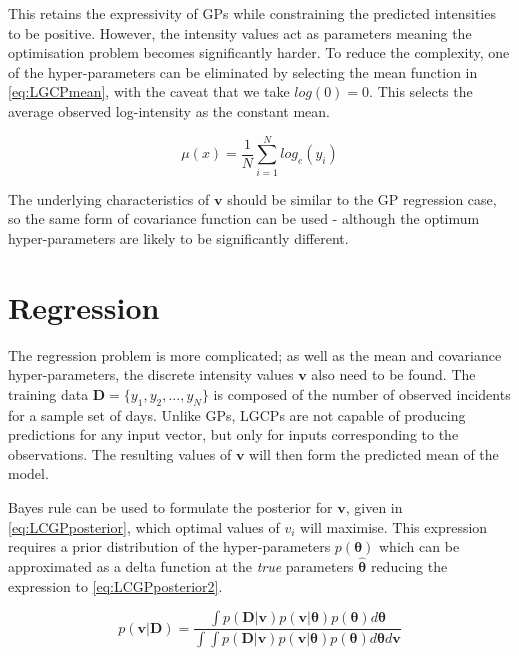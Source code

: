\documentclass[a4paper,11pt]{report}
\begin{document}
This retains the expressivity of GPs while constraining the predicted intensities to be positive. However, the intensity values act as parameters meaning the optimisation problem becomes significantly harder. To reduce the complexity, one of the hyper-parameters can be eliminated by selecting the mean function in \ref{eq:LGCPmean}, with the caveat that we take \(log(0)=0\). This selects the average observed log-intensity as the constant mean. 

\begin{equation} \label{eq:LGCPmean}
\mu (x) = \frac{1}{N} \sum_{i=1}^{N} log_e(y_i)
\end{equation}

The underlying characteristics of \(\mathbf{v}\) should be similar to the GP regression case, so the same form of covariance function can be used - although the optimum hyper-parameters are likely to be significantly different.

\section{Regression}

The regression problem is more complicated; as well as the mean and covariance hyper-parameters, the discrete intensity values \(\mathbf{v}\) also need to be found. The training data \(\mathbf{D} = \{y_1,y_2, ..., y_N\}\) is composed of the number of observed incidents for a sample set of days. Unlike GPs, LGCPs are not capable of producing predictions for any input vector, but only for inputs corresponding to the observations. The resulting values of \(\mathbf{v}\) will then form the predicted mean of the model. \par

Bayes rule can be used to formulate the posterior for \(\mathbf{v}\), given in \ref{eq:LCGPposterior}, which optimal values of \(v_i\) will maximise. This expression requires a prior distribution of the hyper-parameters \(p(\boldsymbol{\theta})\) which can be approximated as a delta function at the \textit{true} parameters \(\hat{\boldsymbol{\theta}}\) reducing the expression to \ref{eq:LCGPposterior2}.

\singlespacing

\begin{equation} \label{eq:LCGPposterior}
p(\mathbf{v | D}) = \frac{\int{p(\mathbf{D|v})p(\mathbf{v}|\boldsymbol{\theta})p(\boldsymbol{\theta}) d\boldsymbol{\theta}}}{\int{\int{p(\mathbf{D|v})p(\mathbf{v}|\boldsymbol{\theta})p(\boldsymbol{\theta}) d\boldsymbol{\theta} d\mathbf{v}}}}
\end{equation}
\end{document}
